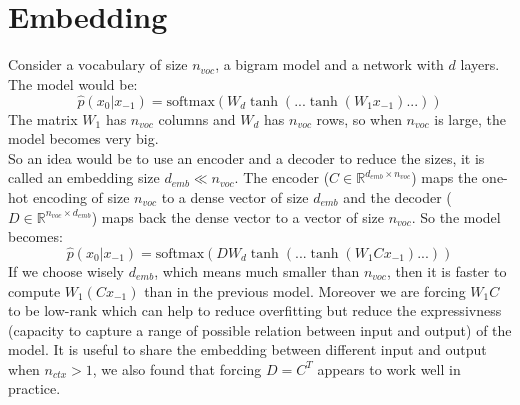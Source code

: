 \documentclass[12pt, openany]{report}
\newcommand{\R}{\mathbb{R}}
\theoremstyle{definition}
\begin{document}
\section{Embedding}
Consider a vocabulary of size $n_{voc}$, a bigram model and a network with $d$ layers. The model would be:
\begin{equation}
  \hat{p}(x_0 | x_{-1}) = \text{softmax}(W_d \tanh(... \tanh(W_1 x_{-1}) ... ))
\end{equation}
The matrix $W_1$ has $n_{voc}$ columns and $W_d$ has $n_{voc}$ rows, so when $n_{voc}$ is large, the model becomes very big.\\
So an idea would be to use an encoder and a decoder to reduce the sizes, it is called an embedding size $d_{emb} \ll n_{voc}$. The encoder ($C \in \R^{d_{emb} \times n_{voc}}$) maps the one-hot encoding of size $n_{voc}$ to a dense vector of size $d_{emb}$ and the decoder ($D \in \R^{n_{voc} \times d_{emb}}$) maps back the dense vector to a vector of size $n_{voc}$. So the model becomes:
\begin{equation}
  \hat{p}(x_0 | x_{-1}) = \text{softmax}(D W_d \tanh(... \tanh(W_1 C x_{-1})... ))
\end{equation}
If we choose wisely $d_{emb}$, which means much smaller than $n_{voc}$, then it is faster to compute $W_1(C x_{-1})$ than in the previous model. Moreover we are forcing $W_1C$ to be low-rank which can help to reduce overfitting but reduce the expressivness (capacity to capture a range of possible relation between input and output) of the model. It is useful to share the embedding between different input and output when $n_{ctx} > 1$, we also found that forcing $D = C^T$ appears to work well in practice.\\
\end{document}
